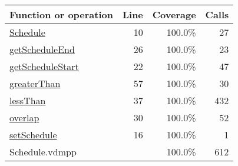 \bigskip
\begin{longtable}{|l|r|r|r|}
\hline
Function or operation & Line & Coverage & Calls \\
\hline
\hline
\hyperref[Schedule:10]{Schedule} & 10&100.0\% & 27 \\
\hline
\hyperref[getScheduleEnd:26]{getScheduleEnd} & 26&100.0\% & 23 \\
\hline
\hyperref[getScheduleStart:22]{getScheduleStart} & 22&100.0\% & 47 \\
\hline
\hyperref[greaterThan:57]{greaterThan} & 57&100.0\% & 30 \\
\hline
\hyperref[lessThan:37]{lessThan} & 37&100.0\% & 432 \\
\hline
\hyperref[overlap:30]{overlap} & 30&100.0\% & 52 \\
\hline
\hyperref[setSchedule:16]{setSchedule} & 16&100.0\% & 1 \\
\hline
\hline
Schedule.vdmpp & & 100.0\% & 612 \\
\hline
\end{longtable}

